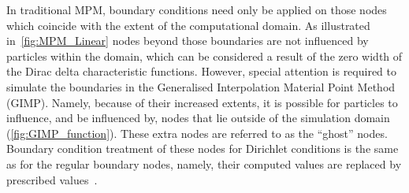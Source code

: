 In traditional MPM, boundary conditions need only be applied on those nodes 
which coincide with the extent of the computational domain. As  illustrated 
in~\cref{fig:MPM_Linear} nodes beyond those boundaries are not influenced by 
particles within the domain, which can be considered a result of the zero
width of the Dirac delta characteristic functions. However, special attention 
is required to simulate the boundaries in the Generalised Interpolation 
Material Point Method (GIMP). Namely, because of their increased extents, it is 
possible for particles to influence, and be influenced by, nodes that lie 
outside of the simulation domain (\cref{fig:GIMP_function}). These extra nodes 
are referred to as the ``ghost'' nodes. Boundary condition treatment of these 
nodes for Dirichlet conditions is the same as for the regular boundary
nodes, namely, their computed values are replaced by prescribed 
values~\citep{Steffen2008}.


